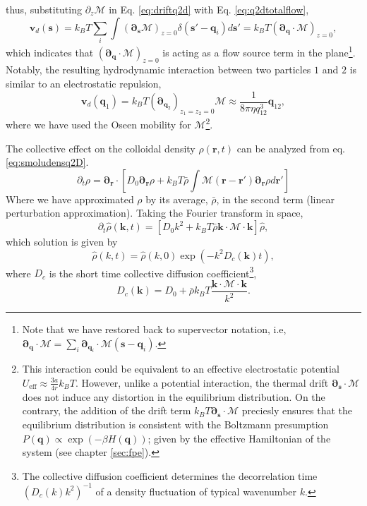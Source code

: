 \documentclass[ twoside,openright,titlepage,numbers=noenddot,%
headinclude,footinclude,cleardoublepage=empty,abstract=on,
BCOR=5mm,paper=b5,fontsize=11pt, dvipsnames
]{scrreprt}
\renewcommand{\vec}[1]{\bm{#1}}
\newcommand{\tens}[1]{\bm{\mathcal{#1}}}
\newcommand{\kT}{k_B T}
\newcommand{\ppos}{q}
\newcommand{\fpos}{r}
\newcommand{\fvel}{v}
\begin{document}
thus, substituting $\partial_z\tens{M}$ in Eq. \eqref{eq:driftq2d} with Eq. \eqref{eq:q2dtotalflow},
\begin{equation}
  \label{eq:flowq2Ddivergence}
  \vec{\fvel}_d(\vec{s}) = \kT\sum_i \int \left( \vec{\partial}_{\vec{s}}\tens{M} \right)_{z=0} \delta(\vec{s}' - \vec{\ppos}_i)d\vec{s}' = \kT\left(\vec{\partial}_{\vec{\ppos}}\cdot\tens{M}\right)_{z=0},
\end{equation}
which indicates that $\left(\vec{\partial}_{\vec{\ppos}}\cdot\tens{M}\right)_{z=0}$ is acting as a flow source term in the plane\footnote{Note that we have restored back to supervector notation, i.e, $\vec{\partial}_{\vec{\ppos}}\cdot\tens{M} = \sum_i\vec{\partial}_{\vec{\ppos}_i}\cdot\tens{M}(\vec{s}-\vec{q}_i)$.}. Notably, the resulting hydrodynamic interaction between two particles $1$ and $2$ is similar to an electrostatic repulsion,
\begin{equation}
  \label{eq:q2Deffrepulsion}
  \vec{\fvel}_d(\vec{q}_1) = \kT\left(\vec{\partial}_{\vec{q}_2}\right)_{z_1=z_2=0}\tens{M} \approx \frac{1}{8\pi\eta q_{12}^3}\vec{q}_{12},
\end{equation}
where we have used the Oseen mobility for $\tens{M}$\footnote{This interaction could be equivalent to an effective electrostatic potential $U_{\text{eff}} \approx \frac{3a}{4r}\kT$. However, unlike a potential interaction, the thermal drift $\vec{\partial}_{\vec{s}}\cdot\tens{M}$ does not induce any distortion in the equilibrium distribution. On the contrary, the addition of the drift term $\kT\vec{\partial}_{\vec{s}}\cdot\tens{M}$ preciesly ensures that the equilibrium distribution is consistent with the Boltzmann presumption $P(\vec{\ppos}) \propto \exp({-\beta}H(\vec{\ppos}))$; given by the effective Hamiltonian of the system (see chapter \ref{sec:fpe}).}.

The collective effect on the colloidal density $\rho(\vec{\fpos},t)$ can be analyzed from eq. \eqref{eq:smoludensq2D}.
\begin{equation}
  \partial_t \rho = \vec{\partial}_{\vec{\fpos}}\cdot\left[D_0\vec{\partial}_{\vec{\fpos}}\rho + \kT \bar{\rho}\int\tens{M}(\vec{\fpos}-\vec{\fpos}')\vec{\partial}_{\vec{\fpos}}\rho d\vec{\fpos}'\right]
\end{equation}
Where we have approximated $\rho$ by its average, $\bar{\rho}$, in the second term (linear perturbation approximation).
Taking the Fourier transform in space,
\begin{equation}
  \partial_t \hat{\rho}(\vec{k},t) = \left[D_0k^2 + \kT \bar{\rho}\vec{k}\cdot\tens{M}\cdot{\vec{k}}\right]\hat{\rho},
\end{equation}
which solution is given by
\begin{equation}
  \hat{\rho}(k,t) = \hat{\rho}(k,0)\exp\left(-k^2D_c(\vec{k}) t\right), 
\end{equation}
where $D_c$ is the short time collective diffusion coefficient\footnote{The collective diffusion coefficient determines the decorrelation time $\left(D_c(k)k^2\right)^{-1}$ of a density fluctuation of typical wavenumber $k$.},
\begin{equation}
  D_c(\vec{k}) = D_0 + \bar{\rho}\kT \frac{\vec{k}\cdot\tens{M}\cdot{\vec{k}}}{k^2}.
\end{equation}
\end{document}
